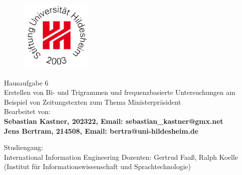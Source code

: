 \begin{titlepage}
\begin{center}
\begin{figure}[htbp]
\begin{center}
\includegraphics[width=3.5cm]{img/UniLogo.png}
\end{center}
\end{figure}

\vspace*{\fill}{
	Stiftung Universität Hildesheim \\ 
	Fachbereich III -- Sprach- und Informationswissenschaften
	\\Institut für Informationswissenschaft und Sprachtechnologie}

\vfill {{\Large Hausaufgabe 6 \\[5mm] Erstellen von Bi- und Trigrammen und
frequenzbasierte Untersuchungen am Beispiel von Zeitungstexten zum Thema
Ministerpräsident}}
\\[2em]
Bearbeitet von:\\
{\normalsize \textbf {Sebastian Kastner, 202322, Email:
sebastian\_kastner@gmx.net}}
\\
{\normalsize \textbf {Jens Bertram, 214508, Email:
bertra@uni-hildesheim.de}}

\vfill{Studiengang:\\ International Information Engineering}
\vfill {Dozenten: Gertrud Faaß, Ralph Koelle\\

(Institut für Informationswissenschaft und Sprachtechnologie)\\}
\end{center}
\end{titlepage}

\thispagestyle{empty}